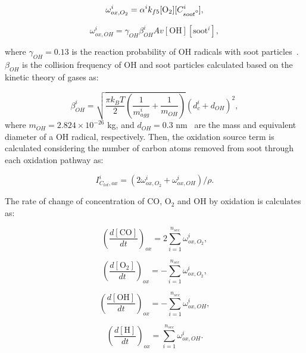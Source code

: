 \begin{equation}
	\omega^i_{ox,O_2} = \alpha^i k_{f5} [\mathrm{O_2}][C^i_{soot\mbox{\textdegree}}],
	\label{eqn:hacaO2Rate}
\end{equation}

\begin{equation}
	\omega^i_{ox,OH} = \gamma_{OH} \beta^i_{OH} Av [\mathrm{OH}][\mathrm{soot}^i],
	\label{eqn:hacaOHRate}
\end{equation}

\noindent where $\gamma_{OH}=0.13$ is the reaction probability of OH radicals with soot particles~\citep{appel2000kinetic}. $\beta_{OH}$ is the collision frequency of OH and soot particles calculated based on the kinetic theory of gases as:

\begin{equation}
	\beta^i_{OH} = 
	\sqrt{
		\frac{\pi k_B T}{2}\left(\frac{1}{m^i_{agg}}+\frac{1}{m_{OH}}\right)
	}
	\left(d^i_c+d_{OH}\right)^2,
	\label{eqn:betaOH}
\end{equation}
\noindent where $m_{OH}=2.824\times10^{-26}$ kg, and $d_{OH}=0.3$ nm~\citep{shepherd2022measurement} are the mass and equivalent diameter of a OH radical, respectively. Then, the oxidation source term is calculated considering the number of carbon atoms removed from soot through each oxidation pathway as:

\begin{equation}
	I^i_{C_{tot},ox} = (2\omega^i_{ox,O_2} + \omega^i_{ox,OH})/\rho
	\label{eqn:ICtot}.
\end{equation}

The rate of change of concentration of CO, $\mathrm{O_2}$ and OH by oxidation is calculates as:

\begin{equation}
	\left(\frac{d\left[{\mathrm{CO}}\right]}{dt}\right)_{ox} = 2\sum_{i=1}^{n_{sec}}\omega^i_{ox,O_2},
	\label{eqn:COrate_ox}
\end{equation}

\begin{equation}
	\left(\frac{d\left[{\mathrm{O_2}}\right]}{dt}\right)_{ox} = -\sum_{i=1}^{n_{sec}}\omega^i_{ox,O_2},
	\label{eqn:O2rate_ox}
\end{equation}

\begin{equation}
	\left(\frac{d\left[{\mathrm{OH}}\right]}{dt}\right)_{ox} = -\sum_{i=1}^{n_{sec}}\omega^i_{ox,OH},
	\label{eqn:Hrate_ox}
\end{equation}

\begin{equation}
	\left(\frac{d\left[{\mathrm{H}}\right]}{dt}\right)_{ox} = \sum_{i=1}^{n_{sec}}\omega^i_{ox,OH}.
	\label{eqn:OHrate_ox}
\end{equation}




